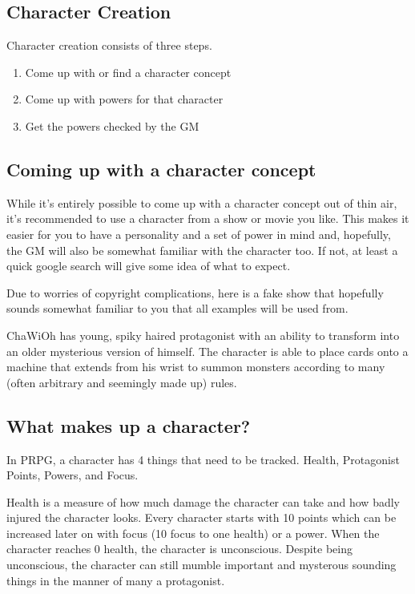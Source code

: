 \begin{flushleft}

\chapter{Character Creation}

Character creation consists of three steps.

\begin{enumerate}

    \item{Come up with or find a character concept}
    \item{Come up with powers for that character}
    \item{Get the powers checked by the GM}

\end{enumerate}

\section*{Coming up with a character concept}

While it's entirely possible to come up with a character concept out of thin
air, it's recommended to use a character from a show or movie you like. This
makes it easier for you to have a personality and a set of power in mind and,
hopefully, the GM will also be somewhat familiar with the character too. If
not, at least a quick google search will give some idea of what to expect.

Due to worries of copyright complications, here is a fake show that hopefully
sounds somewhat familiar to you that all examples will be used from.

ChaWiOh has young, spiky haired protagonist with an ability to transform into
an older mysterious version of himself. The character is able to place cards
onto a machine that extends from his wrist to summon monsters according to many
(often arbitrary and seemingly made up) rules.

\section*{What makes up a character?}

In PRPG, a character has 4 things that need to be tracked. Health, Protagonist
Points, Powers, and Focus.

Health is a measure of how much damage the character can take and how badly
injured the character looks. Every character starts with 10 points which can be
increased later on with focus (10 focus to one health) or a power. When the
character reaches 0 health, the character is unconscious. Despite being
unconscious, the character can still mumble important and mysterous sounding
things in the manner of many a protagonist.


\end{flushleft}
